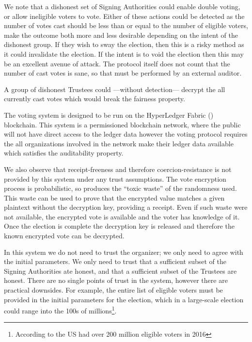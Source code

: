We note that a dishonest set of Signing Authorities could enable double voting, or allow ineligible voters to vote. Either of these actions could be detected as the number of votes cast should be less than or equal to the number of eligible voters, make the outcome both more and less desirable depending on the intent of the dishonest group. If they wish to sway the election, then this is a risky method as it could invalidate the election. If the intent is to void the election then this may be an excellent avenue of attack. The protocol itself does not count that the number of cast votes is sane, so that must be performed by an external auditor.

A group of dishonest Trustees could ---without detection--- decrypt the all currently cast votes which would break the fairness property.

The voting system is designed to be run on the HyperLedger Fabric () blockchain. This system is a permissioned blockchain network, where the public will not have direct access to the ledger data however the voting protocol requires the all organizations involved in the network make their ledger data available which satisfies the auditability property.

We also observe that receipt-freeness and therefore coercion-resistance is not provided by this system under any trust assumptions. The vote encryption process is probabilistic, so produces the ``toxic waste'' of the randomness used. This waste can be used to prove that the encrypted value matches a given plaintext without the decryption key, providing a receipt. Even if such waste were not available, the encrypted vote is available and the voter has knowledge of it. Once the election is complete the decryption key is released and therefore the known encrypted vote can be decrypted.

In this system we do not need to trust the organizer; we only need to agree with the initial parameters. We only need to trust that a sufficient subset of the Signing Authorities ate honest, and that a sufficient subset of the Trustees are honest. There are no single points of trust in the system, however there are practical downsides. For example, the entire list of eligible voters must be provided in the initial parameters for the election, which in a large-scale election could range into the 100s of millions\footnote{According to  the US had over 200 million eligible voters in 2016}.


